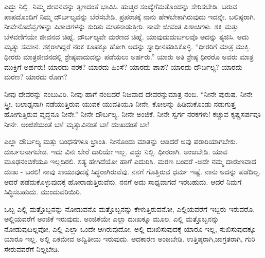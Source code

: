 ಎದ್ದು ನಿಲ್ಲಿ. ನಿಮ್ಮ ಜೀವನವನ್ನು ತೃಣದಂತೆ ಭಾವಿಸಿ. ಹುಚ್ಚರ ಸಂಖ್ಯೆಗೆ\break ಮತ್ತೊಂದನ್ನು ಸೇರಿಸಬೇಡಿ. ಬರುವ ಪಾಪದೊಂದಿಗೆ ನಿಮ್ಮ ದೌರ್ಬಲ್ಯವನ್ನು ಬೆರೆಸ\-ಬೇಡಿ, ಪ್ರಪಂಚಕ್ಕೆ ನಾನು ಹೇಳಬೇಕಾಗಿರುವುದು ಇದನ್ನೇ. ಬಲಿಷ್ಠರಾಗಿ. ನೀವೇನೊ\break ದೆವ್ವಗಳನ್ನು ಪಿಶಾಚಿಗಳನ್ನು ಕುರಿತು ಮಾತನಾಡುತ್ತೀರಿ. ನಾವೇ ಜೀವಂತ ಪಿಶಾಚಿಗಳು. ಶಕ್ತಿ ಮತ್ತು ಬೆಳವಣಿಗೆಯೇ ಜೀವನದ ಚಿಹ್ನೆ. ದೌರ್ಬಲ್ಯವೇ ಮರಣದ ಚಿಹ್ನೆ. ಯಾವುದು\break ದುರ್ಬಲವೊ ಅದನ್ನು ತ್ಯಜಿಸಿ. ಅದು ಮೃತ್ಯು ಸಮಾನ. ಶಕ್ತರಾಗಿದ್ದರೆ ನರಕ ಕೂಪಕ್ಕೂ ಹೋಗಿ ಅದನ್ನು ಸ್ವಾಧೀನಪಡಿಸಿಕೊಳ್ಳಿ. “ಧೀರರಿಗೆ ಮಾತ್ರ ಮುಕ್ತಿ. ಧೀರರು ಮಾತ್ರ\break ಜೀವನದಲ್ಲಿ ಶ್ರೇಷ್ಠವಾದುದನ್ನು ಪಡೆಯಲು ಅರ್ಹರು.” ಯಾರು ಅತಿ ಶ್ರೇಷ್ಠ ಧೀರರೊ ಅವರು ಮಾತ್ರ ಮುಕ್ತಿಗೆ ಅರ್ಹರು! ಯಾರದು ನರಕ? ಯಾರದು ಹಿಂಸೆ? ಯಾರದು ಪಾಪ? ಯಾರದು ದೌರ್ಬಲ್ಯ? ಯಾರದು ಮರಣ? ಯಾರದು ರೋಗ?

ನೀವು ದೇವರನ್ನು ನಂಬುವಿರಿ. ನೀವು ಹಾಗೆ ನಂಬಿದರೆ ನಿಜವಾದ ದೇವರನ್ನು\break ಮಾತ್ರ ನಂಬಿ. “ನೀನೇ ಪುರುಷ. ನೀನೇ ಸ್ತ್ರೀ, ಬಲಾಢ್ಯನಾಗಿ ನಡೆಯುತ್ತಿರುವ ಯುವಕ ಯುವತಿಯೂ ನೀನೇ. ಕೋಲನ್ನು ಹಿಡಿದುಕೊಂಡು ನಡುಗುತ್ತ ಹೋಗುತ್ತಿರುವ ವೃದ್ಧನೂ ನೀನೇ.” ನೀನೇ ದೌರ್ಬಲ್ಯ. ನೀನೇ ಅಂಜಿಕೆ. ನೀನೇ ಸ್ವರ್ಗ ನರಕಗಳು! ಕಚ್ಚುವ ಕೃಷ್ಣಸರ್ಪವೂ ನೀನೇ. ಅಂಜಿಕೆಯಂತೆ ಬಾ! ಮೃತ್ಯುವಿನಂತೆ ಬಾ! ದುಃಖದಂತೆ ಬಾ!

ಎಲ್ಲಾ ದೌರ್ಬಲ್ಯ ಮತ್ತು ಬಂಧನಗಳೂ ಭ್ರಾಂತಿ. ನೀನೊಂದು ಮಾತನ್ನು ಆಡಿದರೆ ಅವು ಪರಾರಿಯಾಗಬೇಕು. ದುರ್ಬಲನಾಗಬೇಡ. ಇದು ವಿನಃ ಬೇರೆ ದಾರಿಯೇ ಇಲ್ಲ. ಎದ್ದು ನಿಲ್ಲಿ. ಧೀರರಾಗಿ. ಅಂಜಬೇಡಿ. ಯಾವ ಮೂಢನಂಬಿಕೆಯೂ ಇಲ್ಲದಿರಲಿ. ಸತ್ಯ ಹೇಗಿದೆಯೋ ಹಾಗೆ ಎದುರಿಸಿ. ಮರಣ ಬಂದರೆ -ಅದೇ ನಮ್ಮ ದಾರುಣವಾದ ದುಃಖ - ಬರಲಿ! ನಾವು ಸಾಯುವುದಕ್ಕೆ ಸಿದ್ಧರಾಗಿರುವೆವು. ನನಗೆ ಗೊತ್ತಿರುವ ಧರ್ಮ ಇಷ್ಟೆ. ನಾನು ಅದನ್ನು ಪಡೆದಿಲ್ಲ. ಆದರೆ ಪಡೆದುಕೊಳ್ಳುವುದಕ್ಕೆ ಹೋರಾಡುತ್ತಿರುವೆನು. ನನಗೆ ಅದು ಸಾಧ್ಯವಾಗದೆ ಇರಬಹುದು. ಆದರೆ ನಿಮಗೆ ಸಿದ್ಧಿಸಬಹುದು. ಮುಂದುವರಿಯಿರಿ.

ಒಬ್ಬ ಎಲ್ಲಿ ಮತ್ತೊಬ್ಬನನ್ನು ನೋಡುವನೊ ಮತ್ತೊಬ್ಬನನ್ನು ಕೇಳುತ್ತಿರುವನೋ, ಎಲ್ಲಿಯವರೆಗೆ ಇಬ್ಬರು ಇರುವರೊ, ಅಲ್ಲಿಯವರೆಗೆ ಅಂಜಿಕೆ ಇರುವುದು. ಅಂಜಿಕೆಯೇ ಎಲ್ಲಾ ದುಃಖಕ್ಕೂ ಮೂಲ. ಎಲ್ಲಿ ಮತ್ತೊಬ್ಬನನ್ನು ನೋಡುವುದಿಲ್ಲವೋ, ಎಲ್ಲಿ ಎಲ್ಲಾ ಒಂದೇ ಆಗಿರುವುದೋ, ಅಲ್ಲಿ ದುಃಖಿಸುವುದಕ್ಕೆ ಯಾರೂ ಇಲ್ಲ, ಸುಖಿಸುವುದಕ್ಕೂ ಯಾರೂ ಇಲ್ಲ. ಅಲ್ಲಿ ಏಕಮೇವ ಅದ್ವಿತೀಯ ಇರುವುದು. ಆದಕಾರಣ ಅಂಜಬೇಡಿ. ಉತ್ತಿಷ್ಠರಾಗಿ,\break ಜಾಗ್ರತರಾಗಿ, ಗುರಿ ಸೇರುವವರೆಗೆ ನಿಲ್ಲಬೇಡಿ.

